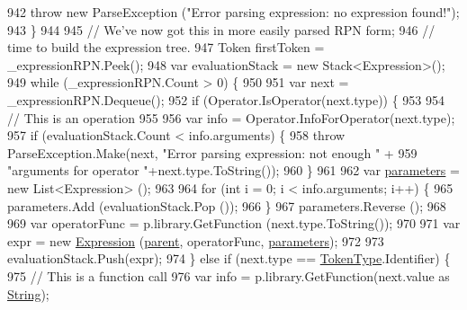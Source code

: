 \begin{DoxyCode}
942                     \textcolor{keywordflow}{throw} \textcolor{keyword}{new} ParseException (\textcolor{stringliteral}{"Error parsing expression: no expression found!"});
943                 \}
944 
945                 \textcolor{comment}{// We've now got this in more easily parsed RPN form; }
946                 \textcolor{comment}{// time to build the expression tree.}
947                 Token firstToken = \_expressionRPN.Peek();
948                 var evaluationStack = \textcolor{keyword}{new} Stack<Expression>();
949                 \textcolor{keywordflow}{while} (\_expressionRPN.Count > 0) \{
950 
951                     var next = \_expressionRPN.Dequeue();
952                     \textcolor{keywordflow}{if} (Operator.IsOperator(next.type)) \{
953 
954                         \textcolor{comment}{// This is an operation}
955 
956                         var info = Operator.InfoForOperator(next.type);
957                         \textcolor{keywordflow}{if} (evaluationStack.Count < info.arguments) \{
958                             \textcolor{keywordflow}{throw} ParseException.Make(next, \textcolor{stringliteral}{"Error parsing expression: not enough "} +
959                                 \textcolor{stringliteral}{"arguments for operator "}+next.type.ToString());
960                         \}
961 
962                         var \hyperlink{a00040_a7b21380bead8ae08b2cfc6594edab32c}{parameters} = \textcolor{keyword}{new} List<Expression> ();
963 
964                         \textcolor{keywordflow}{for} (\textcolor{keywordtype}{int} i = 0; i < info.arguments; i++) \{
965                             parameters.Add (evaluationStack.Pop ());
966                         \}
967                         parameters.Reverse ();
968 
969                         var operatorFunc = p.library.GetFunction (next.type.ToString());
970 
971                         var expr = \textcolor{keyword}{new} \hyperlink{a00040_a91f0536300ebb39eaf9b7526c7e97364}{Expression} (\hyperlink{a00063_af313a82103fcc2ff5a177dbb06b92f7b}{parent}, operatorFunc, 
      \hyperlink{a00040_a7b21380bead8ae08b2cfc6594edab32c}{parameters});
972 
973                         evaluationStack.Push(expr);
974                     \} \textcolor{keywordflow}{else} \textcolor{keywordflow}{if} (next.type == \hyperlink{a00026_a301aa7c866593a5b625a8fc158bbeace}{TokenType}.Identifier) \{
975                         \textcolor{comment}{// This is a function call}
976                         var info = p.library.GetFunction(next.value as \hyperlink{a00026_a301aa7c866593a5b625a8fc158bbeacea27118326006d3829667a400ad23d5d98}{String});

\end{DoxyCode}
